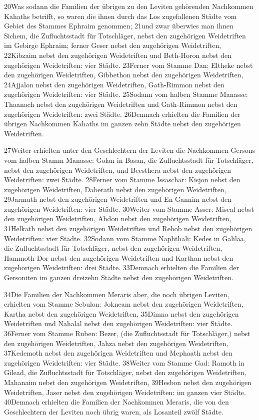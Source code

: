 20Was sodann die Familien der übrigen zu den Leviten gehörenden
Nachkommen Kahaths betrifft, so waren die ihnen durch das Los
zugefallenen Städte vom Gebiet des Stammes Ephraim genommen; 21und zwar
überwies man ihnen Sichem, die Zufluchtsstadt für Totschläger, nebst den
zugehörigen Weidetriften im Gebirge Ephraim; ferner Geser nebst den
zugehörigen Weidetriften, 22Kibzaim nebst den zugehörigen Weidetriften
und Beth-Horon nebst den zugehörigen Weidetriften: vier Städte. 23Ferner
vom Stamme Dan: Eltheke nebst den zugehörigen Weidetriften, Gibbethon
nebst den zugehörigen Weidetriften, 24Ajjalon nebst den zugehörigen
Weidetriften, Gath-Rimmon nebst den zugehörigen Weidetriften: vier
Städte. 25Sodann vom halben Stamme Manasse: Thaanach nebst den
zugehörigen Weidetriften und Gath-Rimmon nebst den zugehörigen
Weidetriften: zwei Städte. 26Demnach erhielten die Familien der übrigen
Nachkommen Kahaths im ganzen zehn Städte nebst den zugehörigen
Weidetriften.

27Weiter erhielten unter den Geschlechtern der Leviten die Nachkommen
Gersons vom halben Stamm Manasse: Golan in Basan, die Zufluchtsstadt für
Totschläger, nebst den zugehörigen Weidetriften, und Beesthera nebst den
zugehörigen Weidetriften: zwei Städte. 28Ferner vom Stamme Issaschar:
Kisjon nebst den zugehörigen Weidetriften, Daberath nebst den
zugehörigen Weidetriften, 29Jarmuth nebst den zugehörigen Weidetriften
und En-Gannim nebst den zugehörigen Weidetriften: vier Städte. 30Weiter
vom Stamme Asser: Miseal nebst den zugehörigen Weidetriften, Abdon nebst
den zugehörigen Weidetriften, 31Helkath nebst den zugehörigen
Weidetriften und Rehob nebst den zugehörigen Weidetriften: vier Städte.
32Sodann vom Stamme Naphthali: Kedes in Galiläa, die Zufluchtsstadt für
Totschläger, nebst den zugehörigen Weidetriften, Hammoth-Dor nebst den
zugehörigen Weidetriften und Karthan nebst den zugehörigen Weidetriften:
drei Städte. 33Demnach erhielten die Familien der Gersoniten im ganzen
dreizehn Städte nebst den zugehörigen Weidetriften.

34Die Familien der Nachkommen Meraris aber, die noch übrigen Leviten,
erhielten vom Stamme Sebulon: Jokneam nebst den zugehörigen
Weidetriften, Kartha nebst den zugehörigen Weidetriften, 35Dimna nebst
den zugehörigen Weidetriften und Nahalal nebst den zugehörigen
Weidetriften: vier Städte. 36Ferner vom Stamme Ruben: Bezer, (die
Zufluchtsstadt für Totschläger,) nebst den zugehörigen Weidetriften,
Jahza nebst den zugehörigen Weidetriften, 37Kedemoth nebst den
zugehörigen Weidetriften und Mephaath nebst den zugehörigen
Weidetriften: vier Städte. 38Weiter vom Stamme Gad: Ramoth in Gilead,
die Zufluchtsstadt für Totschläger, nebst den zugehörigen Weidetriften,
Mahanaim nebst den zugehörigen Weidetriften, 39Hesbon nebst den
zugehörigen Weidetriften, Jaser nebst den zugehörigen Weidetriften: im
ganzen vier Städte. 40Demnach erhielten die Familien der Nachkommen
Meraris, die von den Geschlechtern der Leviten noch übrig waren, als
Losanteil zwölf Städte.

